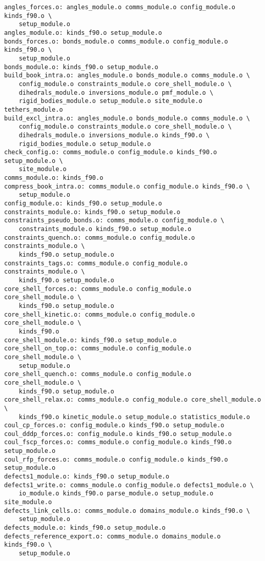 \begin{verbatim}
angles_forces.o: angles_module.o comms_module.o config_module.o kinds_f90.o \
	setup_module.o
angles_module.o: kinds_f90.o setup_module.o
bonds_forces.o: bonds_module.o comms_module.o config_module.o kinds_f90.o \
	setup_module.o
bonds_module.o: kinds_f90.o setup_module.o
build_book_intra.o: angles_module.o bonds_module.o comms_module.o \
	config_module.o constraints_module.o core_shell_module.o \
	dihedrals_module.o inversions_module.o pmf_module.o \
	rigid_bodies_module.o setup_module.o site_module.o tethers_module.o
build_excl_intra.o: angles_module.o bonds_module.o comms_module.o \
	config_module.o constraints_module.o core_shell_module.o \
	dihedrals_module.o inversions_module.o kinds_f90.o \
	rigid_bodies_module.o setup_module.o
check_config.o: comms_module.o config_module.o kinds_f90.o setup_module.o \
	site_module.o
comms_module.o: kinds_f90.o
compress_book_intra.o: comms_module.o config_module.o kinds_f90.o \
	setup_module.o
config_module.o: kinds_f90.o setup_module.o
constraints_module.o: kinds_f90.o setup_module.o
constraints_pseudo_bonds.o: comms_module.o config_module.o \
	constraints_module.o kinds_f90.o setup_module.o
constraints_quench.o: comms_module.o config_module.o constraints_module.o \
	kinds_f90.o setup_module.o
constraints_tags.o: comms_module.o config_module.o constraints_module.o \
	kinds_f90.o setup_module.o
core_shell_forces.o: comms_module.o config_module.o core_shell_module.o \
	kinds_f90.o setup_module.o
core_shell_kinetic.o: comms_module.o config_module.o core_shell_module.o \
	kinds_f90.o
core_shell_module.o: kinds_f90.o setup_module.o
core_shell_on_top.o: comms_module.o config_module.o core_shell_module.o \
	setup_module.o
core_shell_quench.o: comms_module.o config_module.o core_shell_module.o \
	kinds_f90.o setup_module.o
core_shell_relax.o: comms_module.o config_module.o core_shell_module.o \
	kinds_f90.o kinetic_module.o setup_module.o statistics_module.o
coul_cp_forces.o: config_module.o kinds_f90.o setup_module.o
coul_dddp_forces.o: config_module.o kinds_f90.o setup_module.o
coul_fscp_forces.o: comms_module.o config_module.o kinds_f90.o setup_module.o
coul_rfp_forces.o: comms_module.o config_module.o kinds_f90.o setup_module.o
defects1_module.o: kinds_f90.o setup_module.o
defects1_write.o: comms_module.o config_module.o defects1_module.o \
	io_module.o kinds_f90.o parse_module.o setup_module.o site_module.o
defects_link_cells.o: comms_module.o domains_module.o kinds_f90.o \
	setup_module.o
defects_module.o: kinds_f90.o setup_module.o
defects_reference_export.o: comms_module.o domains_module.o kinds_f90.o \
	setup_module.o

\end{verbatim}
